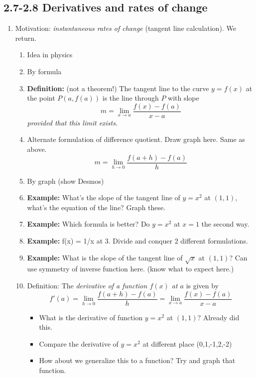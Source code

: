 \documentclass{article}
\begin{document}
\subsection{2.7-2.8 Derivatives and rates of change}
\begin{enumerate}

\item Motivation: \emph{instantaneous rates of change} (tangent line calculation). We return.
\begin{enumerate}
\item Idea in physics
\item By formula
\item {\bf Definition:} (not a theorem!) The tangent line to the curve $y = f(x)$ at the point $P(a,f(a))$ is the line through $P$ with slope 
$$
m = \lim_{x\rightarrow a}\frac{f(x)-f(a)}{x-a}
$$
\emph{provided that this limit exists.}
\item Alternate formulation of difference quotient. Draw graph here. Same as above.
$$
m = \lim_{h\rightarrow 0} \frac{f(a+h)-f(a)}{h}
$$

\item By graph (show Desmos)

\item {\bf Example:} What's the slope of the tangent line of $y=x^2$ at $(1,1)$, what's the equation of the line? Graph these.
\item {\bf Example:} Which formula is better? Do $y = x^2$ at $x = 1$ the second  way.
\item {\bf Example:} f(x) = 1/x at $3$. Divide and conquer 2 different formulations.
\item {\bf Example:} What is the slope of the tangent line of $\sqrt{x}$ at $(1,1)$? Can use symmetry of inverse function here. (know what to expect here.)
\item Definition: The \emph{derivative of a function $f(x)$ at $a$} is given by 
$$
f'(a) = \lim_{h\rightarrow 0}\frac{f(a+h)-f(a)}{h} = \lim_{x\rightarrow a}\frac{f(x)-f(a)}{x-a}
$$
\begin{itemize}
\item What is the derivative of function $y = x^2$ at $(1,1)$? Already did this.
\item Compare the derivative of $y = x^2$ at different place (0,1,-1,2,-2) 
\item How about we generalize this to a function? Try and graph that function. 
\end{itemize}
\end{enumerate}


\end{enumerate}
\end{document}
